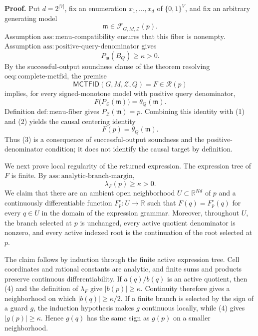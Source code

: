 \textbf{Proof.}
Put \(d=2^{|V|}\), fix an enumeration \(x_1,\ldots,x_d\) of \(\{0,1\}^{V}\), and fix an arbitrary generating model
\[
 \mathfrak m\in\mathcal F_{G,M,\mathcal Z}(p).
\]
Assumption \(\mathrm{ass:menu\text{-}compatibility}\) ensures that this fiber is nonempty. Assumption \(\mathrm{ass:positive\text{-}query\text{-}denominator}\) gives
\[
 P_{\mathfrak m}(B_Q)\geq\kappa>0. \tag{1}
\]
By the successful-output soundness clause of the theorem resolving \(\mathrm{oeq:complete\text{-}mctfid}\), the premise
\[
 \mathsf{MCTFID}(G,M,\mathcal Z,Q)=F\in\mathcal R(p)
\]
implies, for every signed-monotone model with positive query denominator,
\[
 F\bigl(P_{\mathcal Z}(\mathfrak m)\bigr)=\theta_Q(\mathfrak m). \tag{2}
\]
Definition \(\mathrm{def:menu\text{-}fiber}\) gives \(P_{\mathcal Z}(\mathfrak m)=p\). Combining this identity with (1) and (2) yields the causal centering identity
\[
 F(p)=\theta_Q(\mathfrak m). \tag{3}
\]
Thus (3) is a consequence of successful-output soundness and the positive-denominator condition; it does not identify the causal target by definition.

We next prove local regularity of the returned expression. The expression tree of \(F\) is finite. By \(\mathrm{ass:analytic\text{-}branch\text{-}margin}\),
\[
 \lambda_F(p)\geq\kappa>0. \tag{4}
\]
We claim that there are an ambient open neighborhood \(U\subset\mathbb R^{Kd}\) of \(p\) and a continuously differentiable function \(F_p^{\circ}:U\to\mathbb R\) such that \(F(q)=F_p^{\circ}(q)\) for every \(q\in U\) in the domain of the expression grammar. Moreover, throughout \(U\), the branch selected at \(p\) is unchanged, every active quotient denominator is nonzero, and every active indexed root is the continuation of the root selected at \(p\).

The claim follows by induction through the finite active expression tree. Cell coordinates and rational constants are analytic, and finite sums and products preserve continuous differentiability. If \(a(q)/b(q)\) is an active quotient, then (4) and the definition of \(\lambda_F\) give \(|b(p)|\geq\kappa\). Continuity therefore gives a neighborhood on which \(|b(q)|\geq\kappa/2\). If a finite branch is selected by the sign of a guard \(g\), the induction hypothesis makes \(g\) continuous locally, while (4) gives \(|g(p)|\geq\kappa\). Hence \(g(q)\) has the same sign as \(g(p)\) on a smaller neighborhood.


